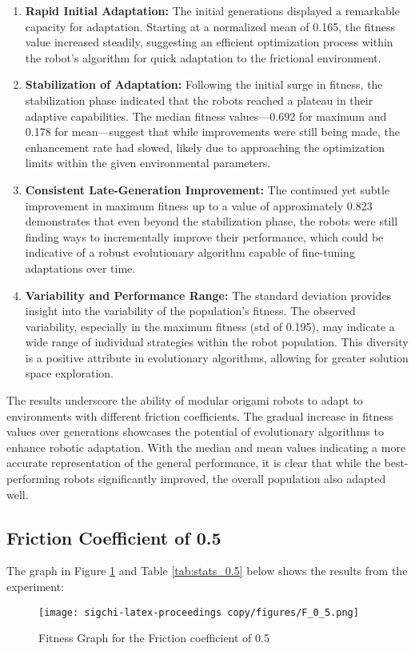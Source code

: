\documentclass{sigchi}
\begin{document}
\begin{enumerate}
    \item \textbf{Rapid Initial Adaptation:} The initial generations displayed a remarkable capacity for adaptation. Starting at a normalized mean of 0.165, the fitness value increased steadily, suggesting an efficient optimization process within the robot's algorithm for quick adaptation to the frictional environment.
    
    \item \textbf{Stabilization of Adaptation:} Following the initial surge in fitness, the stabilization phase indicated that the robots reached a plateau in their adaptive capabilities. The median fitness values—0.692 for maximum and 0.178 for mean—suggest that while improvements were still being made, the enhancement rate had slowed, likely due to approaching the optimization limits within the given environmental parameters.
    
    \item \textbf{Consistent Late-Generation Improvement:} The continued yet subtle improvement in maximum fitness up to a value of approximately 0.823 demonstrates that even beyond the stabilization phase, the robots were still finding ways to incrementally improve their performance, which could be indicative of a robust evolutionary algorithm capable of fine-tuning adaptations over time.
    
    \item \textbf{Variability and Performance Range:} The standard deviation provides insight into the variability of the population's fitness. The observed variability, especially in the maximum fitness (std of 0.195), may indicate a wide range of individual strategies within the robot population. This diversity is a positive attribute in evolutionary algorithms, allowing for greater solution space exploration.
\end{enumerate}

The results underscore the ability of modular origami robots to adapt to environments with different friction coefficients. The gradual increase in fitness values over generations showcases the potential of evolutionary algorithms to enhance robotic adaptation. With the median and mean values indicating a more accurate representation of the general performance, it is clear that while the best-performing robots significantly improved, the overall population also adapted well.

\subsection{Friction Coefficient of 0.5}
The graph in Figure \ref{fig:f0.5}  and Table \ref{tab:stats_0.5} below shows the results from the experiment:
\begin{figure}[h!]
    \centering
    \texttt{[image: sigchi-latex-proceedings copy/figures/F\_0\_5.png]}
    \caption{Fitness Graph for the Friction coefficient of 0.5}
    \label{fig:f0.5}
\end{figure}
\end{document}
